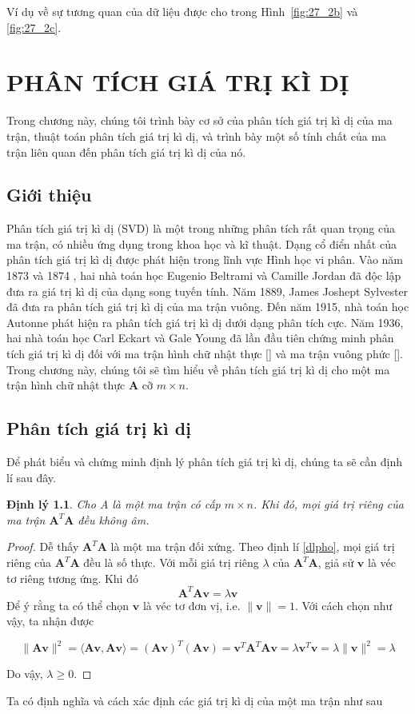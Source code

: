 \documentclass[14pt,oneside,a4paper]{report}
\newtheorem{dl}{Định lý}[section]
\numberwithin{equation}{section}
\begin{document}
Ví dụ về sự tương quan của dữ liệu được cho trong Hình~\ref{fig:27_2b} và
\ref{fig:27_2c}.%
\chapter{ PHÂN TÍCH GIÁ TRỊ KÌ DỊ }

Trong chương này, chúng tôi trình bày cơ sở của phân tích giá trị kì dị của ma trận, thuật toán phân tích giá trị kì dị, và trình bày một số tính chất của ma trận liên quan đến phân tích giá trị kì dị của nó. 
\section{Giới thiệu}
Phân tích giá trị kì dị (SVD) là một trong những phân tích rất quan trọng của ma trận, có nhiều ứng dụng trong khoa học và kĩ thuật. Dạng cổ điển nhất của phân tích giá trị kì dị được phát hiện trong lĩnh vực Hình học vi phân. Vào năm 1873 và 1874 , hai nhà toán học Eugenio Beltrami và Camille Jordan đã độc lập đưa ra giá trị kì dị của dạng song tuyến tính. Năm 1889, James Joshept Sylvester đã đưa ra phân tích giá trị kì dị của ma trận vuông. Đến năm 1915, nhà toán học Autonne phát hiện ra phân tích giá trị kì dị dưới dạng phân tích cực. Năm 1936, hai nhà toán học Carl Eckart và Gale Young đã lần đầu tiên chứng minh phân tích giá trị kì dị đối với ma trận hình chữ nhật thực [] và ma trận vuông phức []. Trong chương này, chúng tôi sẽ tìm hiểu về phân tích giá trị kì dị cho một ma trận hình chữ nhật thực $\mathbf{A}$ cỡ $m \times n$.
\section{Phân tích giá trị kì dị}
Để phát biểu và chứng minh định lý phân tích giá trị kì dị, chúng ta sẽ cần định lí sau đây.

\begin{dl} \label{dl_1} Cho A là một ma trận có cấp $m \times n$. Khi đó, mọi giá trị riêng của ma trận $\mathbf{A}^{T} \mathbf{A}$ đều không âm.
\end{dl}
\begin{proof}
Dễ thấy $\mathbf{A}^{T} \mathbf{A}$ là một ma trận đối xứng. Theo định lí \ref{dlpho}, mọi giá trị riêng của $\mathbf{A}^{T} \mathbf{A}$ đều là số thực. Với mỗi giá trị riêng $\lambda$ của $\mathbf{A}^{T} \mathbf{A}$, giả sử $\mathbf{v}$ là véc tơ riêng tương ứng. Khi đó
\begin{equation} \label{eq1}
	\mathbf{A}^{T} \mathbf{A} \mathbf{v}=\lambda \mathbf{v}
\end{equation}
Để ý rằng ta có thể chọn $\mathbf{v}$ là véc tơ đơn vị, i.e. $\|\mathbf{v}\|=1$. Với cách chọn như vậy, ta nhận được

\begin{equation} \label{eq2}
	\|\mathbf{A} \mathbf{v}\|^{2}=\langle\mathbf{A} \mathbf{v}, \mathbf{A v}\rangle=(\mathbf{A v})^{T}(\mathbf{A v})=\mathbf{v}^{T} \mathbf{A}^{T} \mathbf{A} \mathbf{v}=\lambda \mathbf{v}^{T} \mathbf{v}=\lambda\|\mathbf{v}\|^{2}=\lambda
\end{equation}

Do vậy, $\lambda \geqslant 0$.
\end{proof}
Ta có định nghĩa và cách xác định các giá trị kì dị của một ma trận như sau
\end{document}
